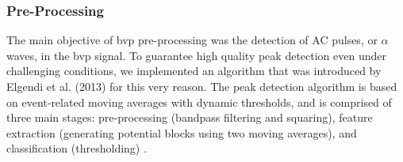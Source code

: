 \subsubsection{Pre-Processing}
The main objective of \gls{bvp} pre-processing was the detection of AC pulses, or $\alpha$ waves, in the \gls{bvp} signal. To guarantee high quality peak detection even under challenging conditions, we implemented an algorithm that was introduced by Elgendi et al. (2013) for this very reason. The peak detection algorithm is based on event-related moving averages with dynamic thresholds, and is comprised of three main stages: pre-processing (bandpass filtering and squaring), feature extraction (generating potential blocks using two moving averages), and classification (thresholding) \cite{Elgendi2013}. 



